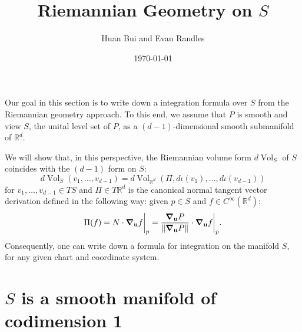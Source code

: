 \documentclass{article}
\author{Huan Bui and Evan Randles}
\title{Riemannian Geometry on $S$}
\date{\today}
\newcommand{\R}{\mathbb{R}}
\newcommand{\f}[2]{\frac{#1}{#2}}
\theoremstyle{theorem}
\newcommand{\Vol}{\operatorname{Vol}}
\begin{document}
\maketitle
Our goal in this section is to write down a integration formula over $S$ from the Riemannian geometry approach. To this end, we assume that $P$ is smooth and view $S$, the unital level set of $P$, as a $(d-1)$-dimensional smooth submanifold of $\R^d$. 





We will show that, in this perspective, the Riemannian volume form $d\Vol_S$ of $S$ coincides with the $(d-1)$ form on $S$:
\begin{equation*}
    d\Vol_S(v_1,\dots,v_{d-1}) = d\Vol_{\R^d}(\Pi, d\iota(v_1),\dots, d\iota(v_{d-1}))
\end{equation*}
for $v_1,\dots,v_{d-1}\in TS$ and $\Pi\in T\mathbb{R}^d$ is the canonical normal tangent vector derivation defined in the following way: given $p\in S$ and $f\in C^{\infty}(\mathbb{R}^d)$:
\begin{equation*}
\Pi(f) = N \cdot \grad_{\bf{u}} f \bigg\vert_{p} = \f{\grad_\mathbf{u} P}{\norm{\grad_\mathbf{u} P}}  \cdot \grad_{\bf{u}} f \bigg\vert_{p}.
\end{equation*} 
Consequently, one can write down a formula for integration on the manifold $S$, for any given chart and coordinate system.


\section{$S$ is a smooth manifold of codimension 1}
\end{document}
